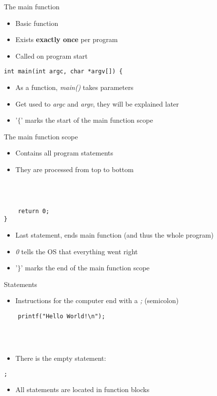 \begin{frame}[fragile]{The main function}
	\begin{itemize}
		\item Basic function
		\item Exists \textbf{exactly once} per program
		\item Called on program start
	\end{itemize}
	\begin{lstlisting}
int main(int argc, char *argv[]) {
\end{lstlisting}
	\begin{itemize}
		\item As a function, \textit{main()} takes parameters
		\item Get used to \textit{argc} and \textit{argv}, they will be explained later
		\item '$\lbrace$' marks the start of the main function scope
	\end{itemize}
\end{frame}
\begin{frame}[fragile]{The main function scope}
	\begin{itemize}
		\item Contains all program statements
		\item They are processed from top to bottom
	\end{itemize} \ \\
	\ \\
	\begin{lstlisting}
	return 0;
}
\end{lstlisting}
	\begin{itemize}
		\item Last statement, ends main function (and thus the whole program)
		\item \textit{0} tells the OS that everything went right
		\item '$\rbrace$' marks the end of the main function scope
	\end{itemize}
\end{frame}
\begin{frame}[fragile]{Statements}
	\begin{itemize}
		\item Instructions for the computer end with a \textit{;} (semicolon)
	\end{itemize}
	\begin{lstlisting}
	printf("Hello World!\n");
\end{lstlisting} \ \\ \ \\
	\begin{itemize}
		\item There is the empty statement:
	\end{itemize}
	\begin{lstlisting}[numbers=none]
	;
\end{lstlisting}
	\begin{itemize}
		\item All statements are located in function blocks
	\end{itemize}
\end{frame}
